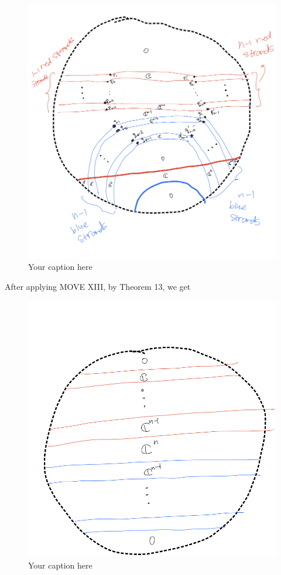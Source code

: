 \begin{figure}[H] %
    \centering
    \includegraphics[width=\linewidth]{diagrams/theorem14/3.png} %
    \caption{Your caption here}
    \label{fig:your-label}
\end{figure}

After applying MOVE \RN{13}, by Theorem 13, we get

\begin{figure}[H] %
    \centering
    \includegraphics[width=\linewidth]{diagrams/theorem14/4.png} %
    \caption{Your caption here}
    \label{fig:your-label}
\end{figure}